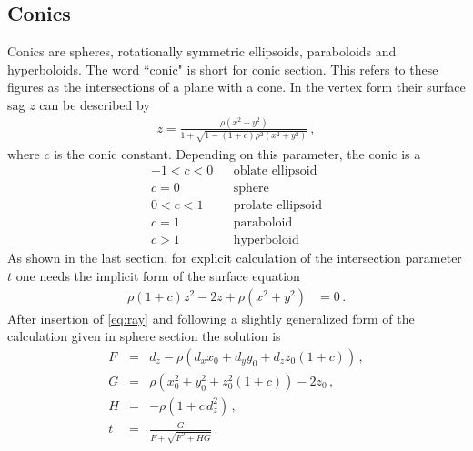 \documentclass[12pt,a4paper,twoside,openright,BCOR10mm,headsepline,titlepage,abstracton,chapterprefix,final]{scrreprt}
\begin{document}
\subsection{Conics}
Conics are spheres, rotationally symmetric ellipsoids, paraboloids and hyperboloids.
The word ``conic" is short for conic section. This refers to these figures as the
intersections of a plane with a cone.
In the vertex form their surface sag $z$ can be described by
\begin{eqnarray}
 z =  \frac
 { \rho ( x^2 + y^2 ) }
 { 1 + \sqrt{1 - (1+c) \rho^2  (x^2 + y^2)} }\,,
\end{eqnarray}
where $c$ is the conic constant. Depending on this parameter, the conic is a
\begin{eqnarray*}
-1 < c < 0 && \textrm{oblate ellipsoid} \\
     c = 0 && \textrm{sphere} \\
 0 < c < 1 && \textrm{prolate ellipsoid} \\
     c = 1 && \textrm{paraboloid} \\
     c > 1 && \textrm{hyperboloid}
\end{eqnarray*}
As shown in the last section, for explicit calculation of the intersection parameter $t$ one
needs the implicit form of the surface equation
\begin{align}
 \rho (1 + c) z^2 - 2 z + \rho (x^2 + y^2) &=0\,.
\end{align}
After insertion of \eqref{eq:ray} and following a slightly generalized form of the calculation
given in sphere section the solution is
\begin{subequations}
\label{eq:intersectionconicsection}
\begin{eqnarray}
   F &=& d_z - \rho \left( d_x x_0 + d_y y_0 + d_z z_0 (1+c) \right)\,, \\
   G &=& \rho (x_0^2 + y_0^2 + z_0^2 (1+c)) - 2 z_0\,, \\
   H &=& - \rho ( 1 + c \, d_z^2 )\,, \\
   t &=& \frac{G}{ F + \sqrt{F^2 + H G} }\,.
\end{eqnarray}
\end{subequations}
\end{document}
